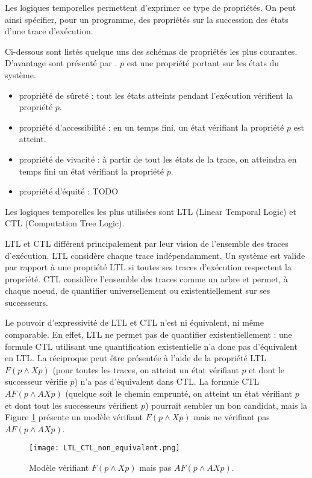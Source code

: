Les logiques temporelles permettent d'exprimer ce type de propriétés. On
peut ainsi spécifier, pour un programme, des propriétés sur la
succession des états d'une trace d'exécution.

Ci-dessous sont listés quelque uns des schémas de propriétés les plus
courantes. D'avantage sont présenté par \citep{LTL_scheme}. \(p\) est une
propriété portant sur les états du système.

\begin{itemize}
\item
  propriété de sûreté : tout les états atteints pendant l'exécution
  vérifient la propriété \(p\).
\item
  propriété d'accessibilité : en un temps fini, un état vérifiant la
  propriété \(p\) est atteint.
\item
  propriété de vivacité : à partir de tout les états de la trace, on
  atteindra en temps fini un état vérifiant la propriété \(p\).
\item
  propriété d'équité : TODO
\end{itemize}

Les logiques temporelles les plus utilisées sont LTL (Linear Temporal
Logic) et CTL (Computation Tree Logic).

LTL et CTL différent principalement par leur vision de l'ensemble des
traces d'exécution. LTL considère chaque trace indépendamment. Un
système est valide par rapport à une propriété LTL si toutes ses traces
d'exécution respectent la propriété. CTL considère l'ensemble des traces
comme un arbre et permet, à chaque noeud, de quantifier universellement
ou existentiellement sur ses successeurs.

Le pouvoir d'expressivité de LTL et CTL n'est ni équivalent, ni même comparable.
En effet, LTL ne permet pas de quantifier existentiellement : une formule CTL
utilisant une quantification existentielle n'a donc pas d'équivalent en LTL. La
réciproque peut être présentée à l'aide de la propriété LTL \(F (p \land X p)\)
(pour toutes les traces, on atteint un état vérifiant \(p\) et dont le
successeur vérifie \(p\)) n'a pas d'équivalent dans CTL. La formule CTL \(AF (p
\land AX p)\) (quelque soit le chemin emprunté, on atteint un état vérifiant
\(p\) et dont tout les successeurs vérifient \(p\)) pourrait sembler un bon
candidat, mais la Figure \ref{LTL_vs_CTL} présente un modèle vérifiant
\(F (p \land X p)\) mais ne vérifiant pas \(AF (p \land AX p)\).

\begin{figure}
\begin{center}
\texttt{[image: LTL\_CTL\_non\_equivalent.png]}
\caption{Modèle vérifiant \(F (p \land X p)\) mais pas \(AF (p \land AX p)\).}
\label{LTL_vs_CTL}
\end{center}
\end{figure}


